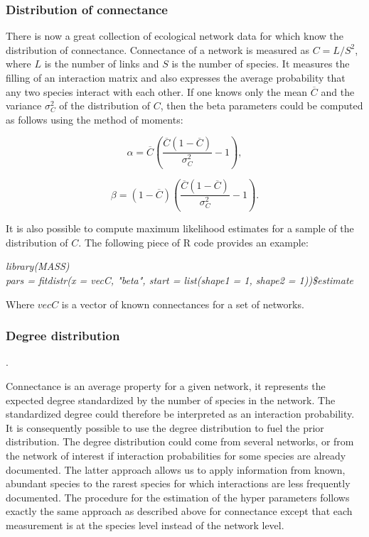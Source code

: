 \documentclass[12pt]{article}
\begin{document}
    \subsubsection*{Distribution of connectance}
      
      There is now a great collection of ecological network data for which know the distribution of connectance. Connectance of a network is measured as $C = L/S^2$, where $L$ is the number of links and $S$ is the number of species. It measures the filling of an interaction matrix and also expresses the average probability that any two species interact with each other. If one  knows only the mean $\overline{C}$ and the variance $\sigma_C^2$ of the distribution of $C$, then the beta parameters could be computed as follows using the method of moments:

  \begin{equation}
    \alpha = \overline{C}(\frac{\overline{C}(1-\overline{C})}{\sigma_C^2}-1) ,
  \end{equation}

  \begin{equation}
    \beta = (1-\overline{C})(\frac{\overline{C}(1-\overline{C})}{\sigma_C^2}-1) .
  \end{equation}
  
  It is also possible to compute maximum likelihood estimates for a sample of the distribution of $C$. The following piece of R code provides an example: 

  \vspace{12pt}
  \noindent\emph{
    library(MASS)\\
    pars = fitdistr(x = vecC, "beta", start = list(shape1 = 1, shape2 = 1))\$estimate
  }
  \vspace{12pt}


  Where $vecC$ is a vector of known connectances for a set of networks. 


  \subsubsection*{Degree distribution}. 

  Connectance is an average property for a given network, it represents the expected degree standardized by the number of species in the network. The standardized degree could therefore be interpreted as an interaction probability. It is consequently possible to use the degree distribution to fuel the prior distribution. The degree distribution could come from several networks, or from the network of interest if interaction probabilities for some species are already documented. The latter approach allows us to apply information from known, abundant species to the rarest species for which interactions are less frequently documented. The procedure for the estimation of the hyper parameters follows exactly the same approach as described above for connectance except that each measurement is at the species level instead of the network level. 
\end{document}

